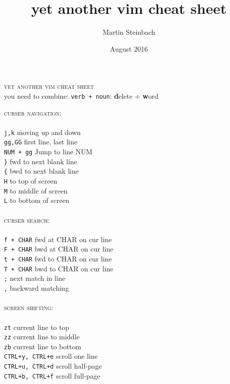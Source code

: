 \documentclass[a4paper,10pt]{scrartcl}
\title{yet another vim cheat sheet}
\author{Martin Steinbach}
\date{August 2016}
\begin{document}
\centering\textsc{\huge{yet another vim cheat sheet}}\\
\vspace{0.5cm}
\large{\centering you need to combine: \texttt{verb + noun}: \textbf{d}elete + \textbf{w}ord}

\begin{multicols}{2}
\begin{tabbing}
\large{\textsc{curser navigation:}}\\\\
\texttt{j,k}		\hspace{2.5 cm}\= moving up and down\\
\texttt{gg,GG}		\> first line, last line\\
\texttt{NUM + gg}		\> Jump to line NUM\\
\texttt{\}}			\> fwd to next blank line\\
\texttt{\{}			\> bwd to next blank line\\
\texttt{H}	\> to top of screen\\
\texttt{M}	\> to middle of screen\\
\texttt{L}	\> to bottom of screen\\\\

\large{\textsc{curser search:}}\\\\
\texttt{f + CHAR} 	\> fwd at CHAR on cur line\\
\texttt{F + CHAR} 	\> bwd at CHAR on cur line\\
\texttt{t + CHAR} 	\> fwd to CHAR on cur line\\
\texttt{T + CHAR} 	\> bwd to CHAR on cur line\\
\texttt{;} 	\> next match in line\\
\texttt{,} 	\> backward matching\\\\

\large{\textsc{screen shifting:}}\\\\
\texttt{zt}			\> current line to top\\
\texttt{zz}			\> current line to middle\\
\texttt{zb}			\> current line to bottom\\
\texttt{CTRL+y, CTRL+e}		\> scroll one line\\
\texttt{CTRL+u, CTRL+d}		\> scroll half-page\\
\texttt{CTRL+b, CTRL+f}		\> scroll full-page\\\\


\end{tabbing}
\end{multicols}
\end{document}
